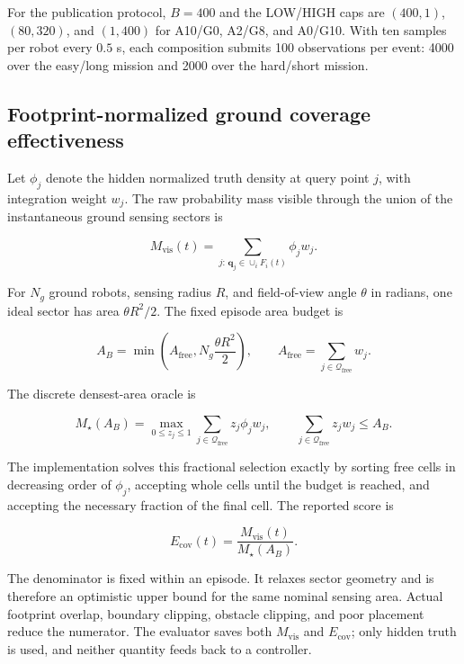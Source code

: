 \documentclass[11pt]{article}
\begin{document}
For the publication protocol, $B=400$ and the LOW/HIGH caps are $(400,1)$,
$(80,320)$, and $(1,400)$ for A10/G0, A2/G8, and A0/G10. With ten samples per
robot every $0.5$ s, each composition submits 100 observations per event:
4000 over the easy/long mission and 2000 over the hard/short mission.


\subsection{Footprint-normalized ground coverage effectiveness}


Let $\phi_j$ denote the hidden normalized truth density at query point $j$,
with integration weight $w_j$. The raw probability mass visible through the
union of the instantaneous ground sensing sectors is


\begin{equation}
M_{\mathrm{vis}}(t)
=
\sum_{j:\,\mathbf q_j\in\cup_i F_i(t)} \phi_j w_j.
\end{equation}


For $N_g$ ground robots, sensing radius $R$, and field-of-view angle $\theta$
in radians, one ideal sector has area $\theta R^2/2$. The fixed episode area
budget is


\begin{equation}
A_B
=
\min\left(
A_{\mathrm{free}},
N_g\frac{\theta R^2}{2}
\right),
\qquad
A_{\mathrm{free}}=\sum_{j\in\mathcal Q_{\mathrm{free}}}w_j.
\end{equation}


The discrete densest-area oracle is


\begin{equation}
M_\star(A_B)
=
\max_{0\le z_j\le 1}
\sum_{j\in\mathcal Q_{\mathrm{free}}}z_j\phi_jw_j,
\qquad
\sum_{j\in\mathcal Q_{\mathrm{free}}}z_jw_j\le A_B.
\end{equation}


The implementation solves this fractional selection exactly by sorting free
cells in decreasing order of $\phi_j$, accepting whole cells until the budget
is reached, and accepting the necessary fraction of the final cell. The
reported score is


\begin{equation}
E_{\mathrm{cov}}(t)
=
\frac{M_{\mathrm{vis}}(t)}{M_\star(A_B)}.
\end{equation}


The denominator is fixed within an episode. It relaxes sector geometry and is
therefore an optimistic upper bound for the same nominal sensing area. Actual
footprint overlap, boundary clipping, obstacle clipping, and poor placement
reduce the numerator. The evaluator saves both $M_{\mathrm{vis}}$ and
$E_{\mathrm{cov}}$; only hidden truth is used, and neither quantity feeds back
to a controller.
\end{document}
